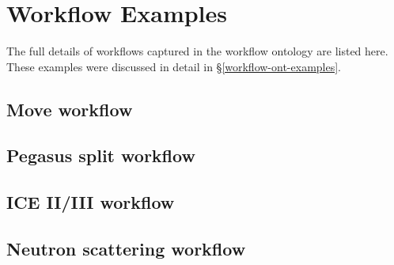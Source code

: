 \chapter*{Workflow Examples}
\label{app:workflow-examples}

The full details of workflows captured in the workflow ontology are listed here.
These examples were discussed in detail in \S \ref{workflow-ont-examples}.

\section{Move workflow}
\label{app:move-workflow}



\section{Pegasus split workflow}
\label{app:pegasus-workflow}



\section{ICE II/III workflow}
\label{app:ice-workflow}



\section{Neutron scattering workflow}
\label{app:neutron-workflow}


